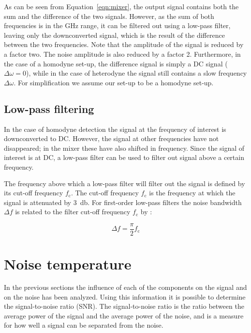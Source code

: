 \documentclass[12pt]{report}
\begin{document}
As can be seen from Equation~\ref{eqn:mixer}, the output signal contains both the sum and the difference of the two signals. However, as the sum of both frequencies is in the GHz range, it can be filtered out using a low-pass filter, leaving only the downconverted signal, which is the result of the difference between the two frequencies. Note that the amplitude of the signal is reduced by a factor two. The noise amplitude is also reduced by a factor 2. Furthermore, in the case of a homodyne set-up, the difference signal is simply a DC signal ($\Delta \omega = 0$), while in the case of heterodyne the signal still contains a slow frequency $\Delta \omega$. For simplification we assume our set-up to be a homodyne set-up.

\subsection{Low-pass filtering}

In the case of homodyne detection the signal at the frequency of interest is downconverted to DC. However, the signal at other frequencies have not disappeared; in the mixer these have also shifted in frequency. Since the signal of interest is at DC, a low-pass filter can be used to filter out signal above a certain frequency.

The frequency above which a low-pass filter will filter out the signal is defined by its cut-off frequency $f_\text{c}$. The cut-off frequency $f_\text{c}$ is the frequency at which the signal is attenuated by \SI{3}{\decibel}. For first-order low-pass filters the noise bandwidth $\Delta f$ is related to the filter cut-off frequency $f_\text{c}$ by \cite[p.~81]{vasilescu2006electronic}:

\begin{equation}
    \Delta f = \frac{\pi}{2} f_\text{c}
    \label{eqn:noisebandwidth}
\end{equation}

\section{Noise temperature}

In the previous sections the influence of each of the components on the signal and on the noise has been analyzed. Using this information it is possible to determine the signal-to-noise ratio (SNR). The signal-to-noise ratio is the ratio between the average power of the signal and the average power of the noise, and is a measure for how well a signal can be separated from the noise.
\end{document}
